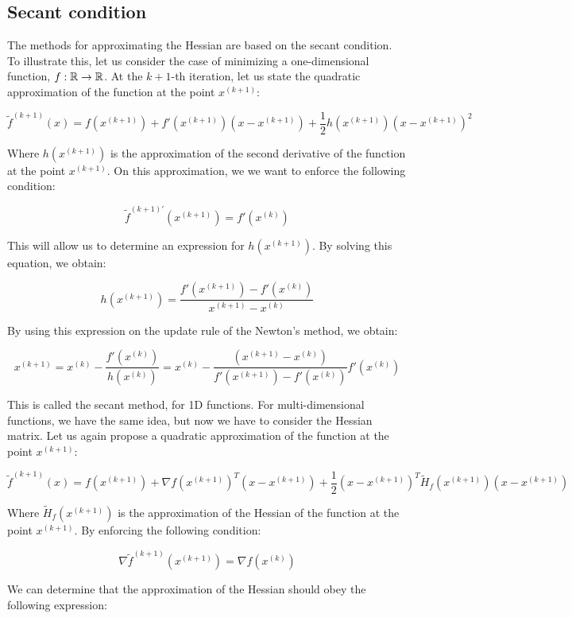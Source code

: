 \subsection{Secant condition}

The methods for approximating the Hessian are based on the secant condition. To illustrate this,
let us consider the case of minimizing a one-dimensional function, $f: \mathbb{R} \rightarrow \mathbb{R}$. At
the $k+1$-th iteration, let us state the quadratic approximation of the function at the point $x^{(k+1)}$:

$$\tilde{f}^{(k+1)}(x) = f(x^{(k+1)}) + f'(x^{(k+1)}) (x - x^{(k+1)}) + \frac{1}{2} h(x^{(k+1)}) (x - x^{(k+1)})^2$$

Where $h(x^{(k+1)})$ is the approximation of the second derivative of the function at the point $x^{(k+1)}$.
On this approximation, we we want to enforce the following condition:

$$\tilde{f}^{(k+1)'}(x^{(k+1)}) = f'(x^{(k)})$$

This will allow us to determine an expression for $h(x^{(k+1)})$. By solving this equation, we obtain:

$$h(x^{(k+1)}) = \frac{f'(x^{(k+1)}) - f'(x^{(k)})}{x^{(k+1)} - x^{(k)}}$$

By using this expression on the update rule of the Newton's method, we obtain:

\begin{equation}
    x^{(k+1)} = x^{(k)} - \frac{f'(x^{(k)})}{h(x^{(k)})} = x^{(k)} - \frac{(x^{(k+1)} - x^{(k)})}{f'(x^{(k+1)}) - f'(x^{(k)})} f'(x^{(k)})
\end{equation}

This is called the secant method, for 1D functions. For multi-dimensional functions, we have the
same idea, but now we have to consider the Hessian matrix. Let us again propose a quadratic
approximation of the function at the point $x^{(k+1)}$:

$$\tilde{f}^{(k+1)}(x) = f(x^{(k+1)}) + \nabla f(x^{(k+1)})^T (x - x^{(k+1)}) + \frac{1}{2} (x - x^{(k+1)})^T \tilde{H}_f(x^{(k+1)}) (x - x^{(k+1)})$$

Where $\tilde{H}_f(x^{(k+1)})$ is the approximation of the Hessian of the function at the point $x^{(k+1)}$.
By enforcing the following condition:

$$\nabla \tilde{f}^{(k+1)}(x^{(k+1)}) = \nabla f(x^{(k)})$$

We can determine that the approximation of the Hessian should obey the following expression:

